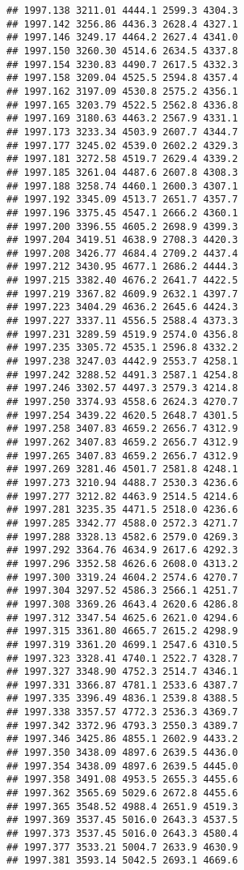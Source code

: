 \documentclass[
]{article}
\begin{document}
\begin{verbatim}
## 1997.138 3211.01 4444.1 2599.3 4304.3
## 1997.142 3256.86 4436.3 2628.4 4327.1
## 1997.146 3249.17 4464.2 2627.4 4341.0
## 1997.150 3260.30 4514.6 2634.5 4337.8
## 1997.154 3230.83 4490.7 2617.5 4332.3
## 1997.158 3209.04 4525.5 2594.8 4357.4
## 1997.162 3197.09 4530.8 2575.2 4356.1
## 1997.165 3203.79 4522.5 2562.8 4336.8
## 1997.169 3180.63 4463.2 2567.9 4331.1
## 1997.173 3233.34 4503.9 2607.7 4344.7
## 1997.177 3245.02 4539.0 2602.2 4329.3
## 1997.181 3272.58 4519.7 2629.4 4339.2
## 1997.185 3261.04 4487.6 2607.8 4308.3
## 1997.188 3258.74 4460.1 2600.3 4307.1
## 1997.192 3345.09 4513.7 2651.7 4357.7
## 1997.196 3375.45 4547.1 2666.2 4360.1
## 1997.200 3396.55 4605.2 2698.9 4399.3
## 1997.204 3419.51 4638.9 2708.3 4420.3
## 1997.208 3426.77 4684.4 2709.2 4437.4
## 1997.212 3430.95 4677.1 2686.2 4444.3
## 1997.215 3382.40 4676.2 2641.7 4422.5
## 1997.219 3367.82 4609.9 2632.1 4397.7
## 1997.223 3404.29 4636.2 2645.6 4424.3
## 1997.227 3337.11 4556.5 2588.4 4373.3
## 1997.231 3289.59 4519.9 2574.0 4356.8
## 1997.235 3305.72 4535.1 2596.8 4332.2
## 1997.238 3247.03 4442.9 2553.7 4258.1
## 1997.242 3288.52 4491.3 2587.1 4254.8
## 1997.246 3302.57 4497.3 2579.3 4214.8
## 1997.250 3374.93 4558.6 2624.3 4270.7
## 1997.254 3439.22 4620.5 2648.7 4301.5
## 1997.258 3407.83 4659.2 2656.7 4312.9
## 1997.262 3407.83 4659.2 2656.7 4312.9
## 1997.265 3407.83 4659.2 2656.7 4312.9
## 1997.269 3281.46 4501.7 2581.8 4248.1
## 1997.273 3210.94 4488.7 2530.3 4236.6
## 1997.277 3212.82 4463.9 2514.5 4214.6
## 1997.281 3235.35 4471.5 2518.0 4236.6
## 1997.285 3342.77 4588.0 2572.3 4271.7
## 1997.288 3328.13 4582.6 2579.0 4269.3
## 1997.292 3364.76 4634.9 2617.6 4292.3
## 1997.296 3352.58 4626.6 2608.0 4313.2
## 1997.300 3319.24 4604.2 2574.6 4270.7
## 1997.304 3297.52 4586.3 2566.1 4251.7
## 1997.308 3369.26 4643.4 2620.6 4286.8
## 1997.312 3347.54 4625.6 2621.0 4294.6
## 1997.315 3361.80 4665.7 2615.2 4298.9
## 1997.319 3361.20 4699.1 2547.6 4310.5
## 1997.323 3328.41 4740.1 2522.7 4328.7
## 1997.327 3348.90 4752.3 2514.7 4346.1
## 1997.331 3366.87 4781.1 2533.6 4387.7
## 1997.335 3396.49 4836.1 2539.8 4388.5
## 1997.338 3357.57 4772.3 2536.3 4369.7
## 1997.342 3372.96 4793.3 2550.3 4389.7
## 1997.346 3425.86 4855.1 2602.9 4433.2
## 1997.350 3438.09 4897.6 2639.5 4436.0
## 1997.354 3438.09 4897.6 2639.5 4445.0
## 1997.358 3491.08 4953.5 2655.3 4455.6
## 1997.362 3565.69 5029.6 2672.8 4455.6
## 1997.365 3548.52 4988.4 2651.9 4519.3
## 1997.369 3537.45 5016.0 2643.3 4537.5
## 1997.373 3537.45 5016.0 2643.3 4580.4
## 1997.377 3533.21 5004.7 2633.9 4630.9
## 1997.381 3593.14 5042.5 2693.1 4669.6

\end{verbatim}
\end{document}
